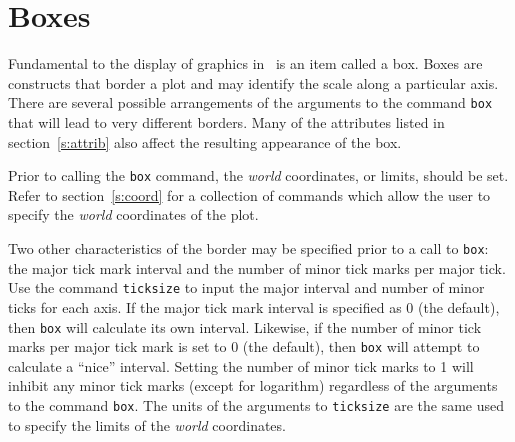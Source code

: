 \section{Boxes}

Fundamental to the display of graphics in \wip\ is an item called a box.
Boxes are constructs that border a plot and may identify the scale along
a particular axis.
There are several possible arrangements of the arguments
to the command
{\tt box}
that will lead to very different borders.
Many of the attributes listed in section~\ref{s:attrib}
also affect the resulting appearance of the box.

Prior to calling the {\tt box} command, the {\em world} coordinates,
or limits, should be set.
Refer to section~\ref{s:coord} for a collection of  commands which
allow the user to specify the
{\em world}
coordinates of the plot.

Two other characteristics of the border may be specified prior to a call to
{\tt box}:
the major tick mark interval and the number of minor tick marks per major tick.
Use the command {\tt ticksize}%
%
to input the major interval and number of minor ticks for each axis.
If the major tick mark interval is specified as 0 (the default),
then {\tt box} will calculate its own interval.
Likewise, if the number of minor tick marks per major tick mark is set
to 0 (the default), then {\tt box} will attempt to calculate
a ``nice'' interval.
Setting the number of minor tick marks to 1 will inhibit any minor tick
marks (except for
logarithm) regardless of the arguments to the command {\tt box}.
The units of the arguments to {\tt ticksize} are the same used to
specify the limits of the {\em world} coordinates.

